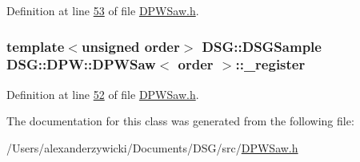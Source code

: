 Definition at line \hyperlink{_d_p_w_saw_8h_source_l00053}{53} of file \hyperlink{_d_p_w_saw_8h_source}{D\+P\+W\+Saw.\+h}.

\hypertarget{class_d_s_g_1_1_d_p_w_1_1_d_p_w_saw_a5b9fcbe7361f56358afd2728c5de4014}{
\subsubsection[{\+\_\+register}]{\setlength{\rightskip}{0pt plus 5cm}template$<$unsigned order$>$ {\bf D\+S\+G\+::\+D\+S\+G\+Sample} {\bf D\+S\+G\+::\+D\+P\+W\+::\+D\+P\+W\+Saw}$<$ order $>$\+::\+\_\+register\hspace{0.3cm}{\ttfamily [protected]}}}\label{class_d_s_g_1_1_d_p_w_1_1_d_p_w_saw_a5b9fcbe7361f56358afd2728c5de4014}


Definition at line \hyperlink{_d_p_w_saw_8h_source_l00052}{52} of file \hyperlink{_d_p_w_saw_8h_source}{D\+P\+W\+Saw.\+h}.



The documentation for this class was generated from the following file\+:\begin{DoxyCompactItemize}
\item 
/\+Users/alexanderzywicki/\+Documents/\+D\+S\+G/src/\hyperlink{_d_p_w_saw_8h}{D\+P\+W\+Saw.\+h}\end{DoxyCompactItemize}
